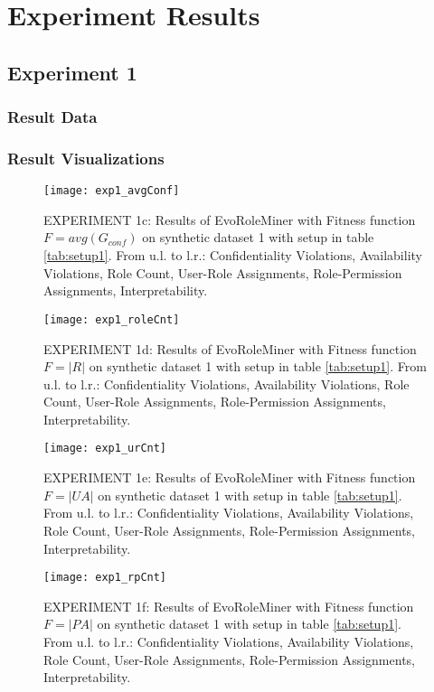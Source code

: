 \chapter{Experiment Results}
\section{Experiment 1}
\label{sec:A_Exp1}
	\subsection{Result Data}
	\label{sec:A_Exp1_Data}
	\subsection{Result Visualizations}
	\label{sec:A_Exp1_Diagrams}
		\begin{figure}[H]
			\centering
		    \texttt{[image: exp1\_avgConf]}
		    \caption{EXPERIMENT 1c: Results of EvoRoleMiner with Fitness function $F=avg(G_{conf})$ on synthetic dataset 1 with setup in table \ref{tab:setup1}. From u.l. to l.r.: Confidentiality Violations, Availability Violations, Role Count, User-Role Assignments, Role-Permission Assignments, Interpretability.}
		    \label{fig:exp1_avgConf}
		\end{figure}
		
		\begin{figure}[H]
			\centering
		    \texttt{[image: exp1\_roleCnt]}
		    \caption{EXPERIMENT 1d: Results of EvoRoleMiner with Fitness function $F=|R|$ on synthetic dataset 1 with setup in table \ref{tab:setup1}. From u.l. to l.r.: Confidentiality Violations, Availability Violations, Role Count, User-Role Assignments, Role-Permission Assignments, Interpretability.}
		    \label{fig:exp1_roleCnt}
		\end{figure}
		
		\begin{figure}[H]
			\centering
		    \texttt{[image: exp1\_urCnt]}
		    \caption{EXPERIMENT 1e: Results of EvoRoleMiner with Fitness function $F=|UA|$ on synthetic dataset 1 with setup in table \ref{tab:setup1}. From u.l. to l.r.: Confidentiality Violations, Availability Violations, Role Count, User-Role Assignments, Role-Permission Assignments, Interpretability.}
		    \label{fig:exp1_urCnt}
		\end{figure}
		
		\begin{figure}[H]
		    \centering
		    \texttt{[image: exp1\_rpCnt]}
	    	\caption{EXPERIMENT 1f: Results of EvoRoleMiner with Fitness function $F=|PA|$ on synthetic dataset 1 with setup in table \ref{tab:setup1}. From u.l. to l.r.: Confidentiality Violations, Availability Violations, Role Count, User-Role Assignments, Role-Permission Assignments, Interpretability.}
	    	\label{fig:exp1_rpCnt}
	    \end{figure}
	
